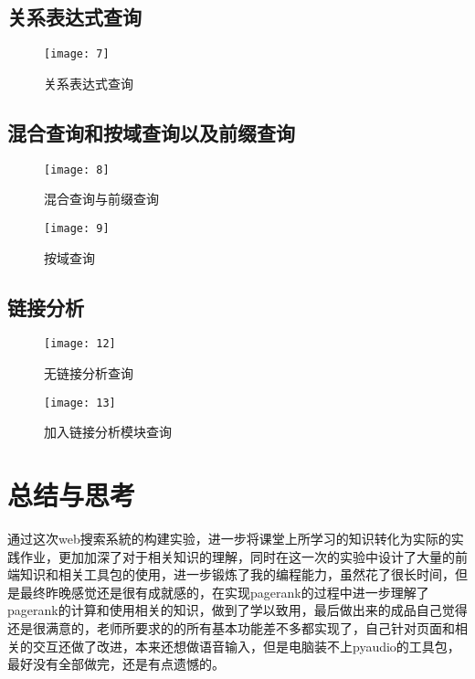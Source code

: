 \documentclass[lang=cn,11pt]{elegantpaper}
\begin{document}
\subsection{关系表达式查询}

\begin{figure}[htbp]
	\centering
	\texttt{[image: 7]}
	\caption{关系表达式查询 \label{fig:9}}
\end{figure}

\subsection{混合查询和按域查询以及前缀查询}

\begin{figure}[htbp]
	\centering
	\texttt{[image: 8]}
	\caption{混合查询与前缀查询\label{fig:10}}
\end{figure}

\begin{figure}[htbp]
	\centering
	\texttt{[image: 9]}
	\caption{按域查询\label{fig:13}}
\end{figure}

\subsection{链接分析}

\begin{figure}[htbp]
	\centering
	\texttt{[image: 12]}
	\caption{无链接分析查询\label{fig:11}}
\end{figure}

\begin{figure}[htbp]
	\centering
	\texttt{[image: 13]}
	\caption{加入链接分析模块查询 \label{fig:12}}
\end{figure}

\newpage
\section{总结与思考}
通过这次web搜索系統的构建实验，进一步将课堂上所学习的知识转化为实际的实践作业，更加加深了对于相关知识的理解，同时在这一次的实验中设计了大量的前端知识和相关工具包的使用，进一步锻炼了我的编程能力，虽然花了很长时间，但是最终昨晚感觉还是很有成就感的，在实现pagerank的过程中进一步理解了pagerank的计算和使用相关的知识，做到了学以致用，最后做出来的成品自己觉得还是很满意的，老师所要求的的所有基本功能差不多都实现了，自己针对页面和相关的交互还做了改进，本来还想做语音输入，但是电脑装不上pyaudio的工具包，最好没有全部做完，还是有点遗憾的。
\end{document}
